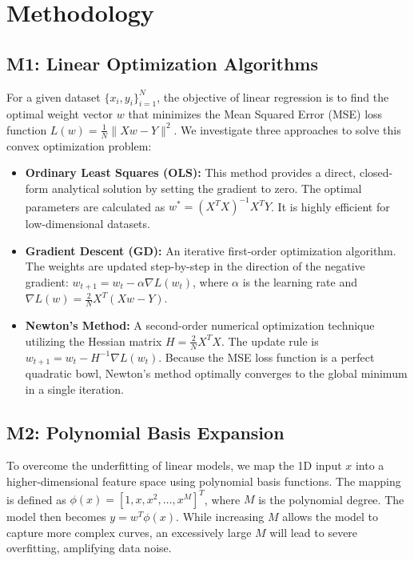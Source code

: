 \documentclass[12pt,a4paper]{article}
\begin{document}
\section*{Methodology}

\subsection*{M1: Linear Optimization Algorithms}
For a given dataset $\{x_i, y_i\}_{i=1}^N$, the objective of linear regression is to find the optimal weight vector $w$ that minimizes the Mean Squared Error (MSE) loss function $L(w) = \frac{1}{N} \|Xw - Y\|^2$. We investigate three approaches to solve this convex optimization problem:
\begin{itemize}
    \item \textbf{Ordinary Least Squares (OLS):} This method provides a direct, closed-form analytical solution by setting the gradient to zero. The optimal parameters are calculated as $w^* = (X^T X)^{-1} X^T Y$. It is highly efficient for low-dimensional datasets.
    \item \textbf{Gradient Descent (GD):} An iterative first-order optimization algorithm. The weights are updated step-by-step in the direction of the negative gradient: $w_{t+1} = w_t - \alpha \nabla L(w_t)$, where $\alpha$ is the learning rate and $\nabla L(w) = \frac{2}{N} X^T (Xw - Y)$.
    \item \textbf{Newton's Method:} A second-order numerical optimization technique utilizing the Hessian matrix $H = \frac{2}{N} X^T X$. The update rule is $w_{t+1} = w_t - H^{-1} \nabla L(w_t)$. Because the MSE loss function is a perfect quadratic bowl, Newton's method optimally converges to the global minimum in a single iteration.
\end{itemize}

\subsection*{M2: Polynomial Basis Expansion}
To overcome the underfitting of linear models, we map the 1D input $x$ into a higher-dimensional feature space using polynomial basis functions. The mapping is defined as $\phi(x) = [1, x, x^2, \dots, x^M]^T$, where $M$ is the polynomial degree. The model then becomes $y = w^T \phi(x)$. While increasing $M$ allows the model to capture more complex curves, an excessively large $M$ will lead to severe overfitting, amplifying data noise.
\end{document}
